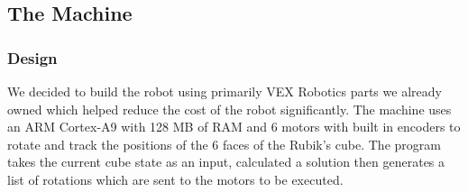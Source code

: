 \documentclass[8pt]{article}
\begin{document}
\subsection{The Machine}

\subsubsection{Design} 

We decided to build the robot using primarily VEX Robotics parts we already owned which helped
reduce the cost of the robot significantly. The machine uses an ARM Cortex-A9 with 
128 MB of RAM and 6 motors with built in encoders to rotate and track the
positions of the 6 faces of the Rubik's cube. The program takes the current cube state 
as an input, calculated a solution then generates a list of rotations which are sent 
to the motors to be executed.
    
\end{document}
